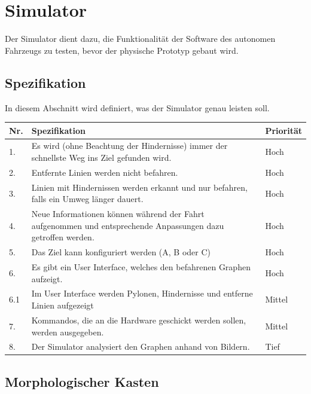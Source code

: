 \documentclass[../main.tex]{subfiles}
\begin{document}
\newpage
\section{Simulator}

Der Simulator dient dazu, die Funktionalität der Software des autonomen Fahrzeugs zu testen, bevor der physische Prototyp gebaut wird.

\subsection{Spezifikation}

In diesem Abschnitt wird definiert, was der Simulator genau leisten soll.



\begin{table}[htbp!]
    \centering
    \begin{tabularx}{\textwidth}{| l | X | l |}
        \hline
        \textbf{Nr.} & \textbf{Spezifikation} & \textbf{Priorität} \\ \hline
        1. & Es wird (ohne Beachtung der Hindernisse) immer der schnellste Weg ins Ziel gefunden wird. & Hoch \\ \hline
        2. & Entfernte Linien werden nicht befahren. & Hoch \\ \hline
        3. & Linien mit Hindernissen werden erkannt und nur befahren, falls ein Umweg länger dauert. & Hoch \\ \hline
        4. & Neue Informationen können während der Fahrt aufgenommen und entsprechende Anpassungen dazu getroffen werden. & Hoch \\ \hline
        5. & Das Ziel kann konfiguriert werden (A, B oder C) & Hoch \\ \hline
        6. & Es gibt ein User Interface, welches den befahrenen Graphen aufzeigt. & Hoch \\ \hline
        6.1 & Im User Interface werden Pylonen, Hindernisse und entferne Linien aufgezeigt & Mittel \\ \hline
        7. & Kommandos, die an die Hardware geschickt werden sollen, werden ausgegeben. & Mittel \\ \hline
        8. & Der Simulator analysiert den Graphen anhand von Bildern. & Tief \\ \hline
    \end{tabularx}
\end{table}

\newpage
\subsection{Morphologischer Kasten}
\end{document}
